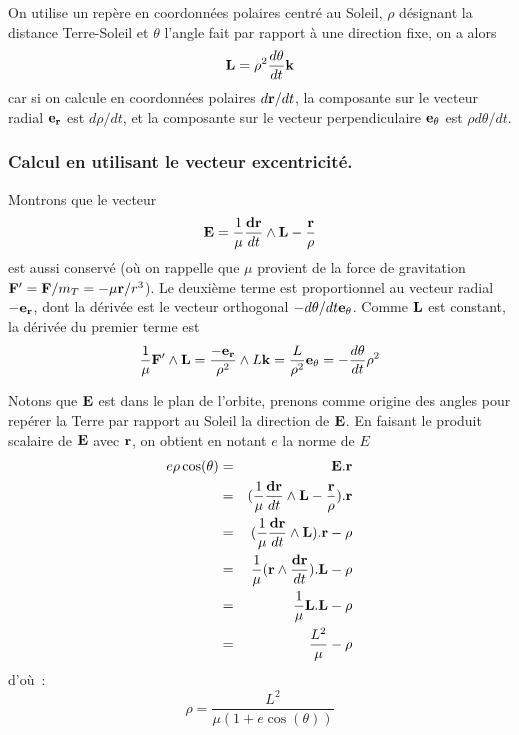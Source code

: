 \documentclass[a4paper,11pt]{article}
\begin{document}
On utilise un repère en coordonnées polaires centré au Soleil,
$\rho$ désignant la distance Terre-Soleil et $\theta$ l'angle
fait par rapport à une direction fixe, on a alors
\[ {\bf L} = \rho^2 \frac{d\theta}{dt} {\bf k}\]
car si on calcule en coordonn\'ees polaires $d {\bf r}/dt$,
la composante sur le vecteur radial ${\bf e_r}$ est $d\rho/dt$, et
la composante sur le vecteur perpendiculaire ${\bf e_\theta}$
est $\rho d\theta/dt$.

\subsubsection{Calcul en utilisant le vecteur excentricit\'e.}
Montrons que le vecteur
\[ {\bf E}= \frac{1}{\mu} \frac{\bf dr}{dt} \wedge {\bf L} - 
\frac{\bf r}{\rho}\]
est aussi conserv\'e (o\`u on rappelle que $\mu$ provient
de la force de gravitation ${\bf F'}={\bf F}/m_T=-\mu {\bf r}/r^3$).
Le deuxi\`eme terme est proportionnel au vecteur
radial $-{\bf e_r}$, dont la d\'eriv\'ee est le vecteur orthogonal
$-d\theta/dt {\bf e_\theta}$.
Comme ${\bf L}$ est constant, la d\'eriv\'ee du premier terme est
\[ \frac{1}{\mu} {\bf F'} \wedge {\bf L} = \frac{\bf -e_r}{\rho^2} \wedge L {\bf k}
= \frac{L}{\rho^2} {\bf e_\theta} = - \frac{d\theta}{dt} \rho^2\]

Notons que ${\bf E}$ est dans le plan de l'orbite, prenons comme origine
des angles pour rep\'erer la Terre par rapport au Soleil la direction
de ${\bf E}$. En faisant le produit scalaire de ${\bf E}$ avec ${\bf r}$, 
on obtient en notant $e$ la norme de $E$
\begin{eqnarray*} e \rho \cos(\theta) &=&  {\bf E}.{\bf r} \\
& = &  (\frac{1}{\mu} \frac{\bf dr}{dt} \wedge {\bf L}- 
\frac{\bf r}{\rho}) .{\bf r} 
\\
& = & (\frac{1}{\mu} \frac{\bf dr}{dt} \wedge {\bf L}).{\bf r}
- \rho \\
& = & \frac{1}{\mu} ({\bf r} \wedge  \frac{\bf dr}{dt} ).{\bf L} - \rho \\
&= & \frac{1}{\mu} {\bf L}.{\bf L}- \rho \\
&= &\frac{L^2}{\mu} - \rho
\end{eqnarray*}
d'o\`u~:
\[ \rho = \frac{L^2}{\mu(1+e \cos(\theta))}\]
\end{document}
